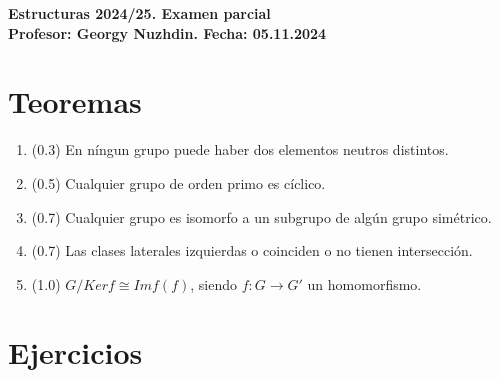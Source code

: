 \documentclass[a4paper,12pt]{article}
\begin{document}
\begin{center}
    \textbf{\Large Estructuras 2024/25. Examen parcial} \\
    \textbf{Profesor: Georgy Nuzhdin. Fecha: 05.11.2024} \\
\end{center}

\section*{Teoremas}
\begin{enumerate}
    \item (0.3) En níngun grupo puede haber dos elementos neutros distintos.

    \item (0.5) Cualquier grupo de orden primo es cíclico.

    \item (0.7) Cualquier grupo es isomorfo a un subgrupo de algún grupo simétrico.

    \item (0.7) Las clases laterales izquierdas o coinciden o no tienen intersección.

    \item (1.0) $G / Kerf \cong Imf(f)$, siendo $f:G\to G'$ un homomorfismo.
\end{enumerate}

\section*{Ejercicios}
\end{document}
